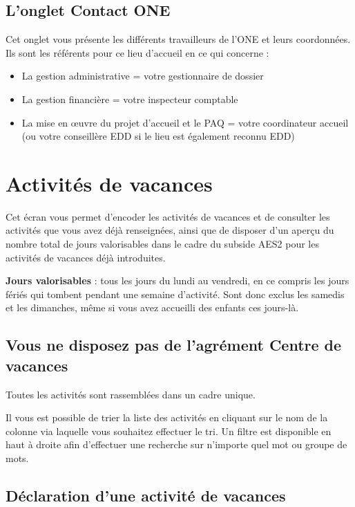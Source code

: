 \subsection{L'onglet Contact ONE}
Cet onglet vous présente les différents travailleurs de l’ONE et leurs coordonnées. Ils sont les référents pour ce lieu d’accueil en ce qui concerne :
\begin{itemize}
    \item La gestion administrative = votre gestionnaire de dossier
    \item La gestion financière = votre inspecteur comptable
    \item La mise en œuvre du projet d’accueil et le PAQ = votre coordinateur accueil (ou votre conseillère EDD si le lieu est également reconnu EDD)
\end{itemize}

\section{Activités de vacances}
Cet écran vous permet d’encoder les activités de vacances et de consulter les activités que vous avez déjà renseignées, ainsi que de disposer d’un aperçu du nombre total de jours valorisables dans le cadre du subside AES2 pour les activités de vacances déjà introduites.

\textbf{Jours valorisables} : tous les jours du lundi au vendredi, en ce compris les jours fériés qui tombent pendant une semaine d’activité. Sont donc exclus les samedis et les dimanches, même si vous avez accueilli des enfants ces jours-là.

\subsection{Vous ne disposez pas de l’agrément Centre de vacances} \label{aes2-nocdv}
Toutes les activités sont rassemblées dans un cadre unique.
\begin{info}
Il vous est possible de trier la liste des activités en cliquant sur le nom de la colonne via laquelle vous souhaitez effectuer le tri.
Un filtre est disponible en haut à droite afin d’effectuer une recherche sur n’importe quel mot ou groupe de mots. 
\end{info}


\subsection{Déclaration d'une activité de vacances}

